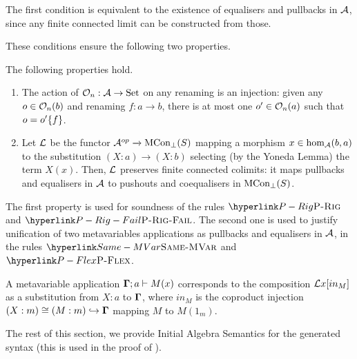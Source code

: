 \begin{full}
\begin{remark}
The first condition is equivalent to the existence of equalisers and
pullbacks in ${\cal A}$, since any finite connected limit can be
constructed from those.
\end{remark}
\end{full}

These conditions ensure the following two properties.
\begin{property}
\label{assu:main-properties}The following properties hold.
\begin{enumerate}[label=(\roman{enumi}), ref=\theproperty.(\roman{enumi})]
\item \label{assu:O-mono}The action of $\Oby n:{\cal A}\rightarrow\Set$
on any renaming is an injection: given any $o\in\Oop nb$ and renaming
$f:a\rightarrow b$, there is at most one $o'\in\Oop na$ such that
$o=\rename{o'}f$.
\item \label{assu:L-finite-conncted}Let ${\cal L}$ be the functor $\op{{\cal A}}\xrightarrow{}\Thbot S$
mapping a morphism $x\in\hom_{{\cal A}}(b,a)$ to the substitution
$(X:a)\rightarrow(X:b)$ selecting (by the Yoneda Lemma) the term
$X(x)$. Then, ${\cal L}$ preserves finite connected colimits: it
maps pullbacks and equalisers in ${\cal A}$ to pushouts and coequalisers
in $\Thbot S$.
\end{enumerate}
\end{property}
The first property is used for soundness of the rules $\refrule{P-Rig}$
and $\refrule{P-Rig-Fail}$. The second one is used to justify unification
of two metavariables applications as pullbacks and equalisers in ${\cal A}$,
in the rules $\refrule{Same-MVar}$ and $\refrule{P-Flex}$.
\begin{remark}
\label{rem:functor-L-intuition}A metavariable application $\dotmcontext{\Gamma};a\vdash M(x)$
corresponds to the composition ${\cal L}x[in_{M}]$ as a substitution
from $X:a$ to $\dotmcontext{\Gamma}$, where $in_{M}$ is the coproduct
injection $(X:m)\cong(M:m)\hookrightarrow\dotmcontext{\Gamma}$ mapping
$M$ to $M(1_{m})$.
\end{remark}
The rest of this section, we provide Initial Algebra Semantics for
the generated syntax (this is used in the proof of ). 

